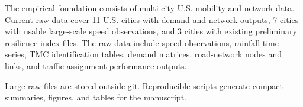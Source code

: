 The empirical foundation consists of multi-city U.S. mobility and network data. Current raw data cover 11 U.S. cities with demand and network outputs, 7 cities with usable large-scale speed observations, and 3 cities with existing preliminary resilience-index files. The raw data include speed observations, rainfall time series, TMC identification tables, demand matrices, road-network nodes and links, and traffic-assignment performance outputs.

Large raw files are stored outside git. Reproducible scripts generate compact summaries, figures, and tables for the manuscript.
